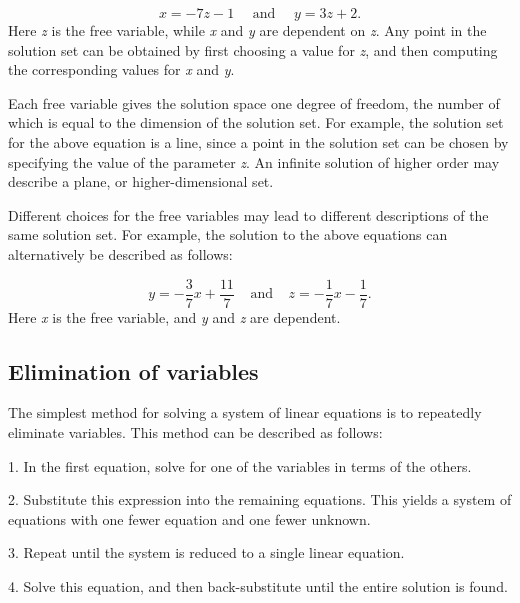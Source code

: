 $$x=-7z-1 \quad \text{ and } \quad y=3z+2\text{.}$$ Here \textit{z} is the free variable,
while \textit{x} and \textit{y} are dependent on \textit{z}. Any point in the solution set
can be obtained by first choosing a value for \textit{z}, and then computing the
corresponding values for \textit{x} and \textit{y}.



Each free variable gives the solution space one degree of freedom, the number of which is
equal to the dimension of the solution set. For example, the solution set for the above
equation is a line, since a point in the solution set can be chosen by specifying the
value of the parameter \textit{z}. An infinite solution of higher order may describe a
plane, or higher-dimensional set.



Different choices for the free variables may lead to different descriptions of the same
solution set. For example, the solution to the above equations can alternatively be
described as follows:



$$y=-\frac{3}{7}x +
\frac{11}{7}\;\;\;\;\text{and}\;\;\;\;z=-\frac{1}{7}x-\frac{1}{7}\text{.}$$ Here
\textit{x} is the free variable, and \textit{y} and \textit{z} are dependent.




\subsection{Elimination of variables}
\label{sss:elim-1b68}




The simplest method for solving a system of linear equations is to repeatedly eliminate
variables. This method can be described as follows:



1.  In the first equation, solve for one of the variables in terms of the others.

2.  Substitute this expression into the remaining equations. This yields a system of
equations with one fewer equation and one fewer unknown.

3.  Repeat until the system is reduced to a single linear equation.

4.  Solve this equation, and then back-substitute until the entire solution is found.



